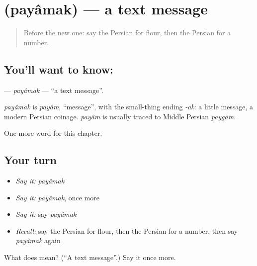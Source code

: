\section[\texorpdfstring{\fa{پیامک} (payâmak)}{پیامک (payâmak)}]{ (payâmak) — a text message}

\label{lesson:FA-C276-payamak}



\begin{quote}
Before the new one: say the Persian for flour, then the Persian for a number.
\end{quote}

\subsection*{You'll want to know: }
\textbf{} — \emph{payâmak} — \textquotedblleft{}a text message\textquotedblright{}.

\begin{cousinweb}
\emph{payâmak} is \emph{payâm}, \textquotedblleft{}message\textquotedblright{}, with the small-thing ending \emph{-ak}: a little message, a modern Persian coinage. \emph{payâm} is usually traced to Middle Persian \emph{paygām}.
\end{cousinweb}

\begin{grammarlens}[title={What you've built}]
One more word for this chapter.
\end{grammarlens}

\subsection*{Your turn}
\begin{itemize}
\raggedright
  \item \emph{Say it:} \emph{payâmak}
  \item \emph{Say it:} \emph{payâmak}, once more
  \item \emph{Say it:} say \emph{payâmak}
  \item \emph{Recall:} say the Persian for flour, then the Persian for a number, then say \emph{payâmak} again
\end{itemize}

\begin{tcolorbox}[breakable,colback=teal!4,colframe=teal!35!black,title={Before you move on}]
What does  mean? (\textquotedblleft{}A text message\textquotedblright{}.) Say it once more.
\end{tcolorbox}
